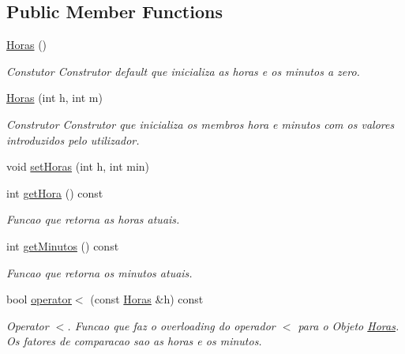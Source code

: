 \subsection*{Public Member Functions}
\begin{DoxyCompactItemize}
\item 
\hypertarget{class_horas_aeef70cbde1c7253dfbb2135fbadc483b}{}\hyperlink{class_horas_aeef70cbde1c7253dfbb2135fbadc483b}{Horas} ()\label{class_horas_aeef70cbde1c7253dfbb2135fbadc483b}

\begin{DoxyCompactList}\small\item\em Constutor Construtor default que inicializa as horas e os minutos a zero. \end{DoxyCompactList}\item 
\hypertarget{class_horas_abbbba3d917352ba3350cafe29753c60f}{}\hyperlink{class_horas_abbbba3d917352ba3350cafe29753c60f}{Horas} (int h, int m)\label{class_horas_abbbba3d917352ba3350cafe29753c60f}

\begin{DoxyCompactList}\small\item\em Construtor Construtor que inicializa os membros hora e minutos com os valores introduzidos pelo utilizador. \end{DoxyCompactList}\item 
void \hyperlink{class_horas_a5da58fcd1a263e3c97e6e11c35b61d76}{set\+Horas} (int h, int min)
\item 
int \hyperlink{class_horas_af72b7e4e7206236f8dc9a4d4b68eff0c}{get\+Hora} () const 
\begin{DoxyCompactList}\small\item\em Funcao que retorna as horas atuais. \end{DoxyCompactList}\item 
int \hyperlink{class_horas_a51e1dd7ac2811960ac1c2faacd034a3c}{get\+Minutos} () const 
\begin{DoxyCompactList}\small\item\em Funcao que retorna os minutos atuais. \end{DoxyCompactList}\item 
bool \hyperlink{class_horas_a3e491978c400b71edf4cb3cff6b81877}{operator$<$} (const \hyperlink{class_horas}{Horas} \&h) const 
\begin{DoxyCompactList}\small\item\em Operator $<$. Funcao que faz o overloading do operador $<$ para o Objeto \hyperlink{class_horas}{Horas}. Os fatores de comparacao sao as horas e os minutos. \end{DoxyCompactList}\end{DoxyCompactItemize}

